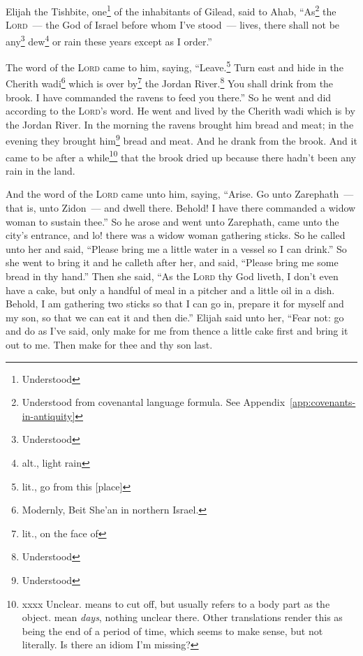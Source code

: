 
\begin{inparaenum}
     Elijah the Tishbite, one\footnote{Understood} of the inhabitants of Gilead, said to Ahab, ``As\footnote{Understood from covenantal language formula. See Appendix~\ref{app:covenants-in-antiquity}} the \textsc{Lord}~--- the God of Israel before whom I've stood~--- lives, there shall not be any\footnote{Understood} dew\footnote{alt., light rain} or rain these years except as I order.''%
    
     The word of the \textsc{Lord} came to him, saying,%
     ``Leave.\footnote{lit., go from this [place]} Turn east and hide in the Cherith wadi\footnote{Modernly, Beit She'an in northern Israel.} which is over by\footnote{lit., on the face of} the Jordan River.\footnote{Understood}%
     You shall drink from the brook. I have commanded the ravens to feed you there.''%
     So he went and did according to the \textsc{Lord}'s word. He went and lived by the Cherith wadi which is by the Jordan River.%
     In the morning the ravens brought him bread and meat; in the evening they brought him\footnote{Understood} bread and meat. And he drank from the brook.%
     And it came to be after a while\footnote{xxxx Unclear.  means to cut off, but usually refers to a body part as the object.  mean \textit{days}, nothing unclear there. Other translations render this as being the end of a period of time, which seems to make sense, but not literally. Is there an idiom I'm missing?} that the brook dried up because there hadn't been any rain in the land.%
    
     And the word of the \textsc{Lord} came unto him, saying,%
     ``Arise. Go unto Zarephath~--- that is, unto Zidon~--- and dwell there. Behold! I have there commanded a widow woman to sustain thee.''%
     So he arose and went unto Zarephath, came unto the city's entrance, and lo! there was a widow woman gathering sticks. So he called unto her and said, ``Please bring me a little water in a vessel so I can drink.''%
     So she went to bring it and he calleth after her, and said, ``Please bring me some bread in thy hand.''%
     Then she said, ``As the \textsc{Lord} thy God liveth, I don't even have a cake, but only a handful of meal in a pitcher and a little oil in a dish. Behold, I am gathering two sticks so that I can go in, prepare it for myself and my son, so that we can eat it and then die.''%
     Elijah said unto her, ``Fear not: go and do as I've said, only make for me from thence a little cake first and bring it out to me. Then make for thee and thy son last.%
    

\end{inparaenum}
